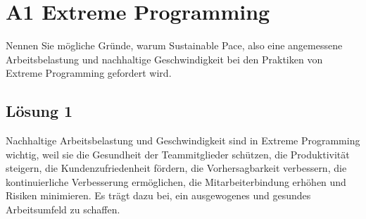 \documentclass[main.tex]{subfiles}
\begin{document}
\section{A1 Extreme Programming}
Nennen Sie mögliche Gründe, warum Sustainable Pace, also eine angemessene Arbeitsbelastung und nachhaltige Geschwindigkeit bei den Praktiken von Extreme Programming gefordert wird.

\subsection{Lösung 1}
Nachhaltige Arbeitsbelastung und Geschwindigkeit sind in Extreme Programming wichtig, weil sie die Gesundheit der Teammitglieder schützen, die Produktivität steigern, die Kundenzufriedenheit fördern, die Vorhersagbarkeit verbessern, die kontinuierliche Verbesserung ermöglichen, die Mitarbeiterbindung erhöhen und Risiken minimieren. Es trägt dazu bei, ein ausgewogenes und gesundes Arbeitsumfeld zu schaffen.
\end{document}
